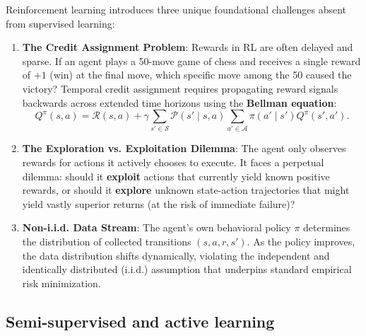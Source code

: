 Reinforcement learning introduces three unique foundational challenges absent from supervised learning:
\begin{enumerate}
  \item \textbf{The Credit Assignment Problem}: Rewards in RL are often delayed and sparse. If an agent plays a 50-move game of chess and receives a single reward of $+1$ (win) at the final move, which specific move among the 50 caused the victory? Temporal credit assignment requires propagating reward signals backwards across extended time horizons using the \textbf{Bellman equation}:
  \begin{equation}
  Q^\pi(s, a) = \mathcal{R}(s, a) + \gamma \sum_{s' \in \mathcal{S}} \mathcal{P}(s' \mid s, a) \sum_{a' \in \mathcal{A}} \pi(a' \mid s') Q^\pi(s', a').
  \end{equation}
  \item \textbf{The Exploration vs. Exploitation Dilemma}: The agent only observes rewards for actions it actively chooses to execute. It faces a perpetual dilemma: should it \textbf{exploit} actions that currently yield known positive rewards, or should it \textbf{explore} unknown state-action trajectories that might yield vastly superior returns (at the risk of immediate failure)?
  \item \textbf{Non-i.i.d. Data Stream}: The agent's own behavioral policy $\pi$ determines the distribution of collected transitions $(s, a, r, s')$. As the policy improves, the data distribution shifts dynamically, violating the independent and identically distributed (i.i.d.) assumption that underpins standard empirical risk minimization.
\end{enumerate}

\subsection{Semi-supervised and active learning}
\label{sec:semi_and_active}

